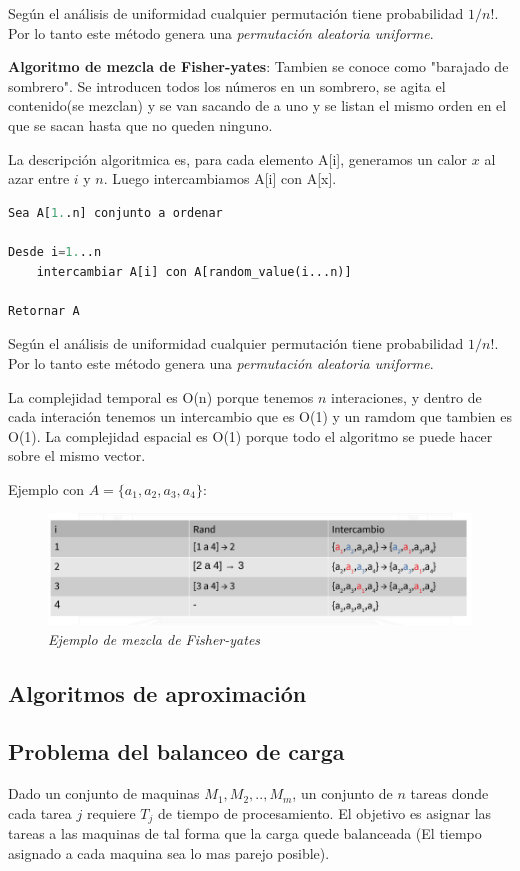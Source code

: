 \documentclass{article}
\begin{document}
Según el análisis de uniformidad cualquier permutación tiene probabilidad \(1/n!\).
Por lo tanto este método genera una \textit{permutación aleatoria uniforme}.

\textbf{Algoritmo de mezcla de Fisher-yates}: Tambien se conoce como "barajado de sombrero".
Se introducen todos los números en un sombrero, se agita el contenido(se mezclan) y se van sacando
de a uno y se listan el mismo orden en el que se sacan hasta que no queden ninguno.

La descripción algoritmica es, para cada elemento A[i], generamos un calor \(x\) al azar entre \(i\) y \(n\). 
Luego intercambiamos A[i] con A[x].

\begin{lstlisting}[language=Python, caption=Algoritmo de Fisher-yates]
Sea A[1..n] conjunto a ordenar

Desde i=1...n
    intercambiar A[i] con A[random_value(i...n)]

Retornar A
\end{lstlisting}    

Según el análisis de uniformidad cualquier permutación tiene probabilidad \(1/n!\).
Por lo tanto este método genera una \textit{permutación aleatoria uniforme}.

La complejidad temporal es O(n) porque tenemos \(n\) interaciones, y dentro de cada interación
tenemos un intercambio que es O(1) y un ramdom que tambien es O(1). La complejidad espacial 
es O(1) porque todo el algoritmo se puede hacer sobre el mismo vector.

Ejemplo con \(A=\{a_1,a_2,a_3,a_4\}\):
\begin{figure}[h!]
    \begin{center} 
    \includegraphics[scale=0.3]{imagenes/ejemplo-mezcla-aleatoria.png}
    \caption{\small \sl Ejemplo de mezcla de Fisher-yates} 
    \end{center}
\end{figure}


\subsection{Algoritmos de aproximación}

\subsection{Problema del balanceo de carga}

Dado un conjunto de maquinas \(M_1,M_2,..,M_m\), un conjunto de \(n\) tareas donde cada tarea \(j\)
requiere \(T_j\) de tiempo de procesamiento. El objetivo es asignar las tareas a las maquinas
de tal forma que la carga quede balanceada (El tiempo asignado a cada maquina sea lo mas parejo posible).
\end{document}
